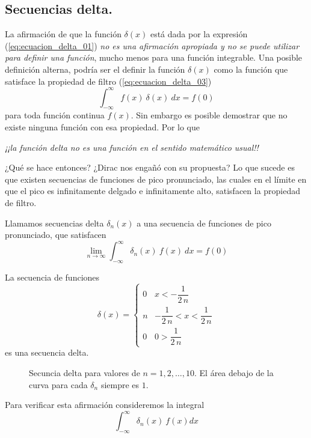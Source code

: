 \subsection{Secuencias delta.}\label{secuencias_delta}
La afirmación de que la función $\delta (x)$ está dada por la expresión (\ref{eq:ecuacion_delta_01}) \textit{no es una afirmación apropiada y no se puede utilizar para definir una función}, mucho menos para una función integrable. Una posible definición alterna, podría ser el definir la función $\delta (x)$ como la función que satisface la propiedad de filtro (\ref{eq:ecuacion_delta_03})
\[ \int_{-\infty}^{\infty} f(x) \: \delta (x) \: dx = f(0)  \]
para toda función continua $f(x)$. Sin embargo es posible demostrar que no existe ninguna función con esa propiedad. Por lo que 
\begin{center}
\textit{¡¡la función delta no es una función en el sentido matemático usual!!}
\end{center}
¿Qué se hace entonces?  ¿Dirac nos engañó con su propuesta? Lo que sucede es que existen secuencias de funciones de pico pronunciado, las cuales en el límite en que el pico es infinitamente delgado e infinitamente alto, satisfacen la propiedad de filtro.
\begin{defi}
Llamamos secuencias delta $\delta_{n} (x)$ a una secuencia de funciones de pico pronunciado, que satisfacen
\[ \lim_{n \to \infty} \int_{-\infty}^{\infty} \delta_{n} (x) \: f(x) \: dx =  f(0) \]
\end{defi}
\begin{ejemplo}
La secuencia de funciones
\begin{equation}
\delta (x) = \begin{cases}
0 & x < - \dfrac{1}{2 \, n} \\
n & - \dfrac{1}{2 \, n} < x < \dfrac{1}{2 \, n} \\
0 & 0 >  \dfrac{1}{2 \, n}
\end{cases}
\label{eq:ecuacion_delta_04}
\end{equation}
es una secuencia delta.
\end{ejemplo}
\begin{figure}[H]
\centering

\caption{Secuncia delta para valores de $n=1,2,\ldots,10$. El área debajo de la curva para cada $\delta_{n}$ siempre es $1$.}
\label{fig:secuncia_delta_01}
\end{figure}
Para verificar esta afirmación consideremos la integral
\[ \int_{-\infty}^{\infty} \delta_{n} (x) \: f(x) dx \]
